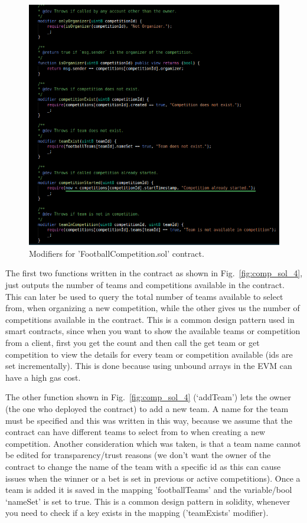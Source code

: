 \begin{figure}[H]
\centering
  \includegraphics[scale = .65]{imgs/comp_sol_3.png}
  \caption{Modifiers for 'FootballCompetition.sol' contract.}
  \label{fig:comp_sol_3}
\end{figure}

\noindent
The first two functions written in the contract as shown in Fig.~\ref{fig:comp_sol_4}, just outputs the number of teams and competitions available in the contract. This can later be used to query the total number of teams available to select from, when organizing a new competition, while the other gives us the number of competitions available in the contract. This is a common design pattern used in smart contracts, since when you want to show the available teams or competition from a client, first you get the count and then call the get team or get competition to view the details for every team or competition available (ids are set incrementally). This is done because using unbound arrays in the EVM can have a high gas cost. 

\noindent
The other function shown in Fig.~\ref{fig:comp_sol_4} (‘addTeam’) lets the owner (the one who deployed the contract) to add a new team. A name for the team must be specified and this was written in this way, because we assume that the contract can have different teams to select from to when creating a new competition. Another consideration which was taken, is that a team name cannot be edited for transparency/trust reasons (we don’t want the owner of the contract to change the name of the team with a specific id as this can cause issues when the winner or a bet is set in previous or active competitions). Once a team is added it is saved in the mapping 'footballTeams' and the variable/bool ‘nameSet’ is set to true. This is a common design pattern in solidity, whenever you need to check if a key exists in the mapping ('teamExists' modifier).


